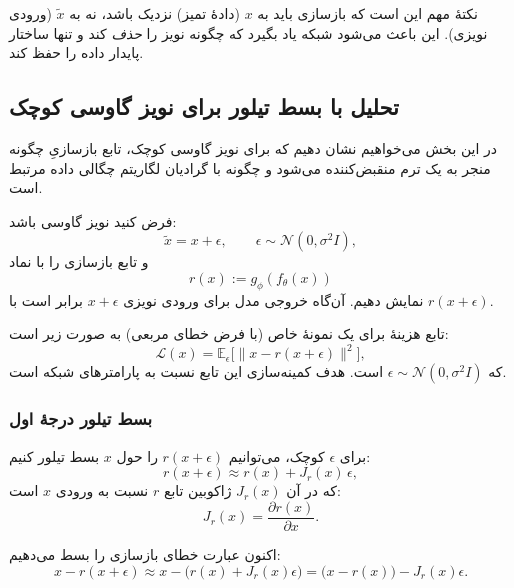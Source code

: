 \documentclass{article}
\begin{document}
نکتهٔ مهم این است که بازسازی باید به $x$ (دادهٔ تمیز) نزدیک باشد، نه به $\tilde{x}$ (ورودی نویزی). این باعث می‌شود شبکه یاد بگیرد که چگونه نویز را \emph{حذف} کند و تنها ساختار پایدار داده را حفظ کند.

\subsection{تحلیل با بسط تیلور برای نویز گاوسی کوچک}

در این بخش می‌خواهیم نشان دهیم که برای نویز گاوسی کوچک، تابع بازسازیِ  چگونه منجر به یک ترم منقبض‌کننده می‌شود و چگونه با گرادیان لگاریتم چگالی داده مرتبط است.

فرض کنید نویز گاوسی باشد:
\begin{equation}
	\tilde{x} = x + \epsilon, \qquad \epsilon \sim \mathcal{N}(0,\sigma^2 I),
\end{equation}
و تابع بازسازی را با نماد
\begin{equation}
	r(x) := g_\phi(f_\theta(x))
\end{equation}
نمایش دهیم. آن‌گاه خروجی مدل برای ورودی نویزی $x+\epsilon$ برابر است با $r(x+\epsilon)$.

تابع هزینهٔ  برای یک نمونهٔ خاص (با فرض خطای مربعی) به صورت زیر است:
\begin{equation}
	\mathcal{L}(x)
	=
	\mathbb{E}_{\epsilon}
	\big[
	\|x - r(x+\epsilon)\|^2
	\big],
\end{equation}
که $\epsilon \sim \mathcal{N}(0,\sigma^2 I)$ است. هدف کمینه‌سازی این تابع نسبت به پارامترهای شبکه است.

\subsubsection{بسط تیلور درجهٔ اول}

برای $\epsilon$ کوچک، می‌توانیم $r(x+\epsilon)$ را حول $x$ بسط تیلور کنیم:
\begin{equation}
	r(x+\epsilon)
	\approx
	r(x) + J_r(x)\, \epsilon,
\end{equation}
که در آن $J_r(x)$ ژاکوبین تابع $r$ نسبت به ورودی $x$ است:
\begin{equation}
	J_r(x)
	=
	\frac{\partial r(x)}{\partial x}.
\end{equation}

اکنون عبارت خطای بازسازی را بسط می‌دهیم:
\begin{equation}
	x - r(x+\epsilon)
	\approx
	x - \big( r(x) + J_r(x)\epsilon \big)
	=
	\big(x - r(x)\big) - J_r(x)\epsilon.
\end{equation}
\end{document}
